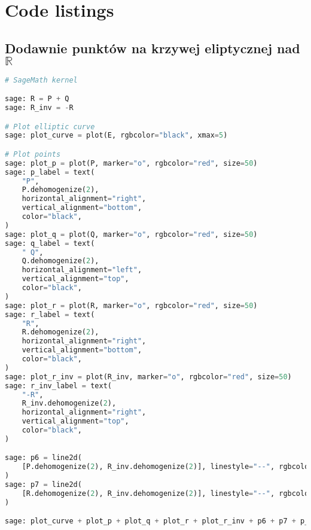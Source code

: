 \newpage %
\section{Code listings}
\subsection{Dodawnie punktów na krzywej eliptycznej nad $\mathbb{R}$}

\begin{lstlisting}[language=python]
# SageMath kernel

sage: R = P + Q
sage: R_inv = -R

# Plot elliptic curve
sage: plot_curve = plot(E, rgbcolor="black", xmax=5)

# Plot points
sage: plot_p = plot(P, marker="o", rgbcolor="red", size=50)
sage: p_label = text(
    "P",
    P.dehomogenize(2),
    horizontal_alignment="right",
    vertical_alignment="bottom",
    color="black",
)
sage: plot_q = plot(Q, marker="o", rgbcolor="red", size=50)
sage: q_label = text(
    " Q",
    Q.dehomogenize(2),
    horizontal_alignment="left",
    vertical_alignment="top",
    color="black",
)
sage: plot_r = plot(R, marker="o", rgbcolor="red", size=50)
sage: r_label = text(
    "R",
    R.dehomogenize(2),
    horizontal_alignment="right",
    vertical_alignment="bottom",
    color="black",
)
sage: plot_r_inv = plot(R_inv, marker="o", rgbcolor="red", size=50)
sage: r_inv_label = text(
    "-R",
    R_inv.dehomogenize(2),
    horizontal_alignment="right",
    vertical_alignment="top",
    color="black",
)

sage: p6 = line2d(
    [P.dehomogenize(2), R_inv.dehomogenize(2)], linestyle="--", rgbcolor="blue"
)
sage: p7 = line2d(
    [R.dehomogenize(2), R_inv.dehomogenize(2)], linestyle="--", rgbcolor="blue"
)

sage: plot_curve + plot_p + plot_q + plot_r + plot_r_inv + p6 + p7 + p_label + q_label + r_label + r_inv_label
\end{lstlisting}

